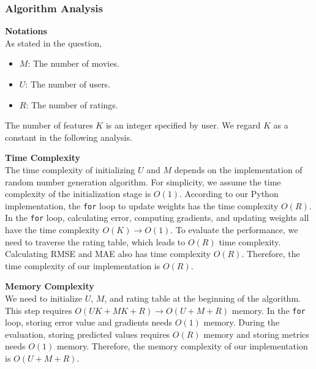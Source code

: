\documentclass[12pt]{article}
\begin{document}
\subsubsection{Algorithm Analysis}
\noindent\textbf{Notations}\\
As stated in the question,
\begin{itemize}
    \item $M$: The number of movies.
    \item $U$: The number of users.
    \item $R$: The number of ratings.
\end{itemize}
The number of features $K$ is an integer specified by user. We regard $K$ as a constant in the following analysis.\par
\vspace{0.3cm}
\noindent\textbf{Time Complexity}\\
The time complexity of initializing $U$ and $M$ depends on the implementation of random number generation algorithm. For simplicity, we assume the time complexity of the initialization stage is $O(1)$. According to our Python implementation, the \texttt{for} loop to update weights has the time complexity $O(R)$. In the \texttt{for} loop, calculating error, computing gradients, and updating weights all have the time complexity $O(K) \rightarrow O(1)$. To evaluate the performance, we need to traverse the rating table, which leads to $O(R)$ time complexity. Calculating RMSE and MAE also has time complexity $O(R)$. Therefore, the time complexity of our implementation is $O(R)$.\par 
\vspace{0.3cm}
\noindent\textbf{Memory Complexity}\\
We need to initialize $U$, $M$, and rating table at the beginning of the algorithm. This step requires $O(UK + MK + R)\rightarrow O(U + M + R)$ memory. In the \texttt{for} loop, storing error value and gradients needs $O(1)$ memory. During the evaluation, storing predicted values requires $O(R)$ memory and storing metrics needs $O(1)$ memory. Therefore, the memory complexity of our implementation is $O(U + M + R)$.
\end{document}
